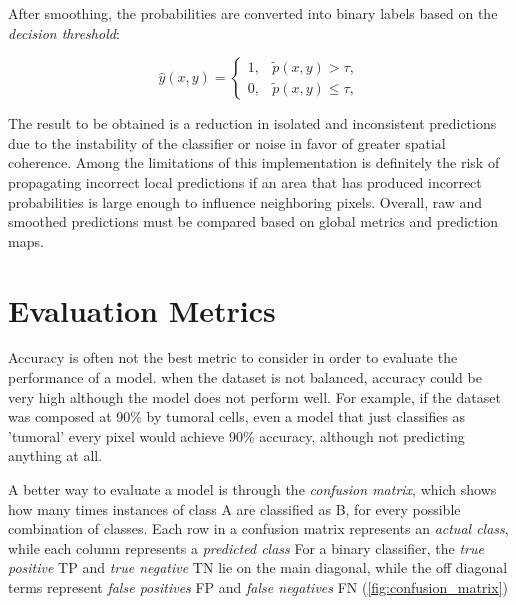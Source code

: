After smoothing, the probabilities are converted into binary labels based on the \textit{decision threshold}:

\begin{equation}
    \hat{y}(x,y) =
    \begin{cases}
        1, & \tilde{p}(x,y) > \tau,\\
        0, & \tilde{p}(x,y) \leq \tau,
    \end{cases}
    \label{eq:threshold_after_smoothing-ch4}
\end{equation}

The result to be obtained is a reduction in isolated and inconsistent predictions due to the instability of the classifier or noise in favor of greater spatial coherence. Among the limitations of this implementation is definitely the risk of propagating incorrect local predictions if an area that has produced incorrect probabilities is large enough to influence neighboring pixels. Overall, raw and smoothed predictions must be compared based on global metrics and prediction maps.

\section{Evaluation Metrics}
\label{sec:evaluation_metrics}

Accuracy is often not the best metric to consider in order to evaluate the performance of a model. when the dataset is not balanced, accuracy could be very high although the model does not perform well. For example, if the dataset was composed at 90\% by tumoral cells, even a model that just classifies as 'tumoral' every pixel would achieve 90\% accuracy, although not predicting anything at all.

A better way to evaluate a model is through the \textit{confusion matrix}, which shows how many times instances of class A are classified as B, for every possible combination of classes. Each row in a confusion matrix represents an \textit{actual class}, while each column represents a \textit{predicted class}
For a binary classifier, the \textit{true positive} TP and \textit{true negative} TN lie on the main diagonal, while the off diagonal terms represent \textit{false positives} FP and \textit{false negatives} FN (\cref{fig:confusion_matrix})

